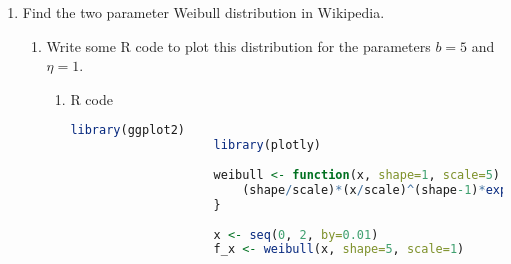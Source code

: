 \documentclass{article}
\begin{document}
\begin{enumerate}
\begin{enumerate}
			Hence $D = 0$
			\item Use R to plot a the function $f(x,y)$. Use the following range $ -2 < x < 2$  and $-2 < y < 2$.
			\begin{enumerate}
				\item Rcode   
				\begin{lstlisting}[language=R]
					# Specify range of x and y values
					xs <- seq(from = -2.0, to = 2.0, by = 0.5)
					ys <- seq(from = -2.0, to = 2.0, by = 0.5)
					
					#define the function
					fx <- function (x, y) {
						return (exp(-(1/3)*(x^2) + x - y^3))
					}
					# find matrix of values in both directions and apply function
					z <- outer(xs, ys, fx)
					
					# plot graph
					plot_ly(
					z = z, x=xs, y=ys, 
					type="contour", 
					colorscale='Bluered',
					width = 800, height = 500)
				\end{lstlisting}
				\hfill [2 marks]
				\item Plot
				
				
				\texttt{[image: images/1b\_ii\_b.png]}
				\texttt{[image: images/1b\_ii\_a.png]}
				\hfill [2 marks]
			\end{enumerate}
			\item Use the optim function in R to confirm your results in (a).    
			\begin{enumerate}
				\item R code \& Output.
				
				\hfill [2 marks]
			\end{enumerate}
		\end{enumerate}
		\item Find the two parameter Weibull distribution in Wikipedia.
		\begin{enumerate}
			\item Write some R code to plot this distribution for the parameters $b = 5$ and $\eta = 1$.
			\begin{enumerate}
				\item R code 
				\begin{lstlisting}[language=R]
					library(ggplot2)
					library(plotly)
					
					weibull <- function(x, shape=1, scale=5) {
						(shape/scale)*(x/scale)^(shape-1)*exp(-(x/scale)^(shape))
					}
					
					x <- seq(0, 2, by=0.01)
					f_x <- weibull(x, shape=5, scale=1)
					

\end{lstlisting}
\end{enumerate}
\end{enumerate}
\end{enumerate}
\end{document}
